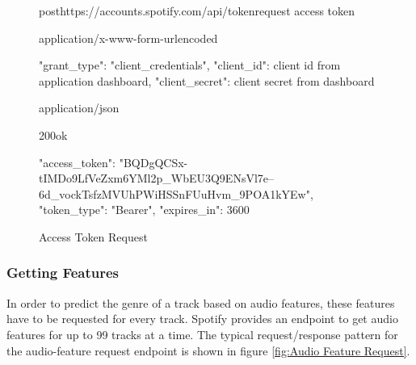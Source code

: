 \begin{figure}[H]
    \caption{Access Token Request}
	\label{fig:Access Token Request}
\begin{apiRoute}{post}{https://accounts.spotify.com/api/token}{request access token}
    \begin{routeRequest}{application/x-www-form-urlencoded}
        \begin{routeRequestBody}
{
    "grant_type": "client_credentials",
    "client_id": client id from application dashboard,
    "client_secret": client secret from dashboard
}
        \end{routeRequestBody}
    \end{routeRequest}
    \begin{routeResponse}{application/json}
        \begin{routeResponseItem}{200}{ok}
            \begin{routeResponseItemBody}
{
    "access_token": "BQDgQCSx-tIMDo9LfVeZxm6YMl2p_WbEU3Q9ENsVl7e--6d_vockTsfzMVUhPWiHSSnFUuHvm_9POA1kYEw",
    "token_type": "Bearer",
    "expires_in": 3600
}
            \end{routeResponseItemBody}
        \end{routeResponseItem}
    \end{routeResponse}
\end{apiRoute}
\end{figure}


\subsubsection{Getting Features}

In order to predict the genre of a track based on audio features, these features have to be requested
for every track. Spotify provides an endpoint to get audio features for up to 99 tracks at a time.
The typical request/response pattern for the audio-feature request endpoint is shown in figure \ref{fig:Audio Feature Request}.

